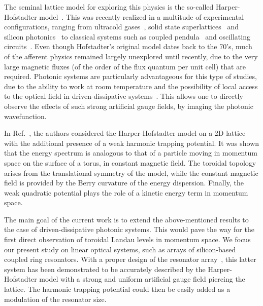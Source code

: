 \documentclass[twocolumn, 10pt, aps, superscriptaddress, floatfix, showpacs, pra, citeautoscript]{revtex4-1}
\newcommand{\co}[2]{#2}
\renewcommand{\paragraph}{\co}
\begin{document}
\paragraph{Experimental realisations of HH}
The seminal lattice model for exploring this physics is the so-called
Harper-Hofstadter
model~\cite{harper1955magnetic,hofstadter1976butterfly}. This was
recently realized in a multitude of experimental configurations,
ranging from ultracold
gases~\cite{aidelsburger2013hh,miyake2013hh,mancini2015edge,stuhl2015edge},
solid state superlattices~\cite{dean2013hofstadter,yu2014hierarchy}
and silicon photonics~\cite{hafezi2013imaging} to classical systems
such as coupled pendula~\cite{susstrunk2015pendula} and oscillating
circuits~\cite{jia2013circuits}. Even though Hofstadter's original
model dates back to the 70's, much of the afferent physics remained
largely unexplored until recently, due to the very large magnetic
fluxes (of the order of the flux quantum per unit cell) that are
required.
Photonic systems are particularly advantageous for this type of
studies, due to the ability to work at room temperature and the
possibility of local access to the optical field in driven-dissipative
systems~\cite{carusotto2013fluids}. This allows one to directly
observe the effects of such strong artificial gauge fields, by imaging
the photonic wavefunction.

\paragraph{Momentum space dual of HH model provides new insights.}
In Ref.~, the authors considered the
Harper-Hofstadter model on a 2D lattice with the additional presence
of a weak harmonic trapping potential. It was shown that the energy
spectrum is analogous to that of a particle moving in momentum space
on the surface of a torus, in constant magnetic field.  The toroidal
topology arises from the translational symmetry of the model, while
the constant magnetic field is provided by the Berry curvature of the
energy dispersion. Finally, the weak quadratic potential plays the
role of a kinetic energy term in momentum space.

\paragraph{The main goal and its importance.}
The main goal of the current work is to extend the above-mentioned
results to the case of driven-dissipative photonic systems. This would
pave the way for the first direct observation of toroidal Landau
levels in momentum space.
We focus our present study on linear optical systems, such as arrays
of silicon-based coupled ring resonators.  With a proper design of the
resonator array~\cite{hafezi2013imaging}, this latter system has been
demonstrated to be accurately described by the Harper-Hofstadter model
with a strong and uniform artificial gauge field piercing the lattice.
The harmonic trapping potential could then be easily added as a
modulation of the resonator size.
\end{document}
